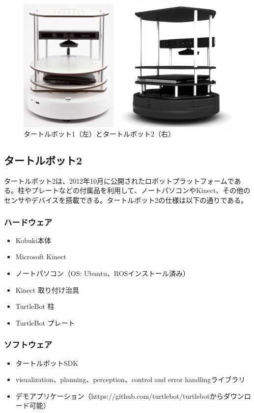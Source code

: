 \begin{figure}[ht]
  \centering
  \includegraphics[width=\columnwidth]{pictures/chapter9/pic_09_01.png}
  \caption{タートルボット1（左）とタートルボット2（右）}
\end{figure}

\subsection{タートルボット2}

タートルボット2は、2012年10月に公開されたロボットプラットフォームである。柱やプレートなどの付属品を利用して、ノートパソコンやKinect、その他のセンサやデバイスを搭載できる。タートルボット2の仕様は以下の通りである。

\subsubsection{ハードウェア}
\begin{itemize}
\item Kobuki本体
\item Microsoft Kinect
\item ノートパソコン（OS: Ubuntu、ROSインストール済み）
\item Kinect 取り付け治具
\item TurtleBot 柱
\item TurtleBot プレート
\end{itemize}

\subsubsection{ソフトウェア}
\begin{itemize}
\item タートルボットSDK
\item visualization、planning、perception、control and error handlingライブラリ
\item デモアプリケーション（https://github.com/turtlebot/turtlebotからダウンロード可能）
\end{itemize}

